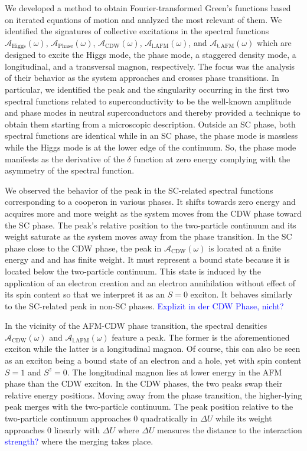 \documentclass[
    reprint, 
    aps,
    preprintnumbers,
    twocolumn,
    prb,
    superscriptaddress
]{revtex4-2}
\newcommand{\spectral}[1]{\mathcal{A}_\text{#1}  (\omega)}
\newcommand{\blue}[1]{\textcolor{blue}{#1}}
\begin{document}
We developed a method to obtain Fourier-transformed Green's functions
based on iterated equations of motion and analyzed the most relevant
of them. We identified the signatures of collective excitations in the spectral functions 
$\spectral{Higgs}$, $\spectral{Phase}$, $\spectral{CDW}$, $\spectral{l.AFM}$, and $\spectral{t.AFM}$ 
which are designed to excite the Higgs mode, the phase mode, a staggered density mode, a longitudinal, and a transversal magnon, respectively. 
The focus was the analysis of their behavior as the system approaches and crosses phase transitions.
In particular, we identified the peak and the singularity occurring in the first two 
spectral functions related to superconductivity
to be the well-known amplitude and phase modes in neutral superconductors 
and thereby provided a technique to obtain them starting from a microscopic description.
Outside an SC phase, both spectral functions are identical while in an SC phase,
the phase mode is massless while the Higgs mode is at the lower edge of the continuum.
So, the phase mode manifests as the derivative of the $\delta$ function at zero energy
complying with the asymmetry of the spectral function.

We observed the behavior of the peak in the SC-related spectral functions corresponding to a cooperon in various phases. 
It shifts towards zero energy and acquires more and more weight as the system moves from the CDW phase toward the SC phase. 
The peak's relative position to the two-particle continuum and its weight saturate 
as the system moves away from the phase transition.
In the SC phase close to the CDW phase, the peak in $\spectral{CDW}$ 
is located at a finite energy and and has finite weight. 
It must represent a bound state because it is located below the two-particle continuum. 
This state is induced by the application of an electron creation and an electron annihilation without effect of its spin content so that we interpret it as an $S=0$ exciton.
It behaves similarly to the SC-related peak in non-SC phases. \blue{Explizit in der CDW Phase, nicht?}

In the vicinity of the AFM-CDW phase transition, the spectral densities
$\spectral{CDW}$ and $\spectral{l.AFM}$ feature a peak. 
The former is the aforementioned exciton while the latter is a longitudinal magnon. 
Of course, this can also be seen as an exciton being a bound
state of an electron and a hole, yet with spin content $S=1$ and $S^z=0$. 
The longitudinal magnon lies at lower energy in the AFM phase than the CDW exciton. 
In the CDW phases, the two peaks swap their relative energy positions. 
Moving away from the phase transition, the higher-lying peak merges with the two-particle continuum. 
The peak position relative to the two-particle continuum approaches $0$ 
quadratically in $\Delta U$ while its weight approaches $0$ linearly with $\Delta U$ where
$\Delta U$ measures the distance to the interaction \blue{strength?} where the merging takes place.
\end{document}
